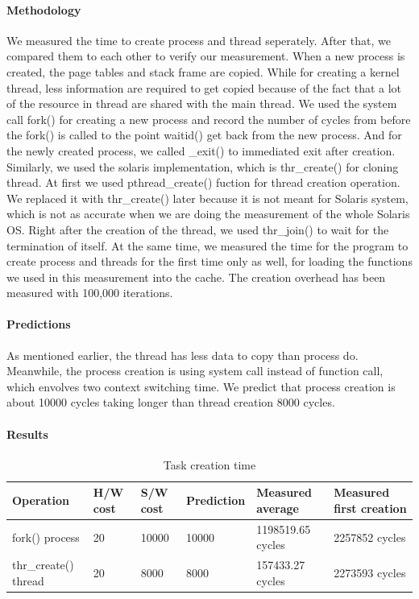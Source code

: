\paragraph{Methodology}
We measured the time to create process and thread seperately. After that, we compared them to each other to verify our measurement. When a new process is created, the page tables and stack frame are copied. While for creating a kernel thread, less information are required to get copied because of the fact that a lot of the resource in thread are shared with the main thread.
We used the system call fork() for creating a new process and record the number of cycles from before the fork() is called to the point waitid() get back from the new process. And for the newly created process, we called \_exit() to immediated exit after creation.
Similarly, we used the solaris implementation, which is thr\_create() for cloning thread. At first we used pthread\_create() fuction for thread creation operation. We replaced it with thr\_create() later because it is not meant for Solaris system, which is not as accurate when we are doing the measurement of the whole Solaris OS. Right after the creation of the thread, we used thr\_join() to wait for the termination of itself.
At the same time, we measured the time for the program to create process and threads for the first time only as well, for loading the functions we used in this measurement into the cache.
The creation overhead has been measured with 100,000 iterations.



\paragraph{Predictions}

As mentioned earlier, the thread has less data to copy than process do. Meanwhile, the process creation is using system call instead of function call, which envolves two context switching time. We predict that process creation is about 10000 cycles taking longer than thread creation 8000 cycles.






\paragraph{Results}
\begin{table}[h]
\begin{center}
\begin{tabular}{| l | l | l | l | l | l |}
\hline
Operation & H/W cost & S/W cost & Prediction & Measured average & Measured first creation \\
\hline
fork() process 		& 20  & 10000  	& 10000 & 1198519.65 cycles & 2257852 cycles\\ \hline
thr\_create() thread 	& 20  & 8000	& 8000  &  157433.27 cycles & 2273593 cycles \\ \hline
\end{tabular}
\end{center}
\caption{Task creation time\label{tab:task-creation}}

\end{table}

